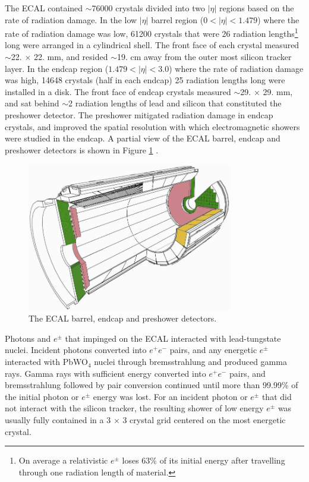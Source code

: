 The ECAL contained $\sim$76000 crystals divided into two $|\eta|$ regions based on the rate of radiation 
damage.  In the low $|\eta|$ barrel region ($0 < |\eta| < 1.479$) where the rate of radiation damage was low, 61200 
crystals that were 26 radiation lengths\footnote{On average a relativistic $e^{\pm}$ loses 63\% of its initial energy after 
travelling through one radiation length of material.} long were arranged in a cylindrical shell.  The front face of 
each crystal measured $\sim$22. $\times$ 22. mm, and resided $\sim$19. cm away from the outer most silicon tracker layer.  
In the endcap region ($1.479 < |\eta| < 3.0$) where the rate of radiation damage was high, 14648 crystals (half in each 
endcap) 25 radiation lengths long were installed in a disk.  The front face of endcap crystals measured $\sim$29. 
$\times$ 29. mm, and sat behind $\sim$2 radiation lengths of lead and silicon that constituted the preshower detector.  
The preshower mitigated radiation damage in endcap crystals, and improved the spatial resolution with 
which electromagnetic showers were studied in the endcap.  A partial view of the ECAL barrel, endcap and 
preshower detectors is shown in Figure \ref{fig:ecalEBEEandES} \cite{ecalTDR}.

\begin{figure}[ht]
	\centering
	\includegraphics[width=0.8\textwidth]{figures/ecalBarrelEndcapAndPreshower.png}
	\caption{The ECAL barrel, endcap and preshower detectors.}
	\label{fig:ecalEBEEandES}
\end{figure}

Photons and $e^{\pm}$ that impinged on the ECAL interacted with lead-tungstate nuclei.  Incident photons 
converted into $e^{+}e^{-}$ pairs, and any energetic $e^{\pm}$ interacted with PbWO$_{4}$ nuclei through 
bremsstrahlung and produced gamma rays.  Gamma rays with sufficient energy converted into $e^{+}e^{-}$ pairs, 
and bremsstrahlung followed by pair conversion continued until more than 99.99\% of the initial photon or 
$e^{\pm}$ energy was lost.  For an incident photon or $e^{\pm}$ that did not interact with the silicon 
tracker, the resulting shower of low energy $e^{\pm}$ was usually fully contained in a 3 $\times$ 3 crystal 
grid centered on the most energetic crystal.


